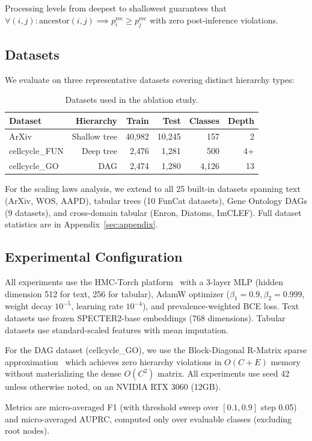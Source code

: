 Processing levels from deepest to shallowest guarantees that $\forall
(i,j): \text{ancestor}(i,j) \implies p_i^{\text{rec}} \geq
p_j^{\text{rec}}$ with zero post-inference violations.

\subsection{Datasets}

We evaluate on three representative datasets covering distinct hierarchy
types:

\begin{table}[H]
\centering
\caption{Datasets used in the ablation study.}
\label{tab:datasets}
\begin{tabular}{lrrrrr}
\toprule
\textbf{Dataset} & \textbf{Hierarchy} & \textbf{Train} & \textbf{Test} &
\textbf{Classes} & \textbf{Depth} \\
\midrule
ArXiv & Shallow tree & 40,982 & 10,245 & 157 & 2 \\
cellcycle\_FUN & Deep tree & 2,476 & 1,281 & 500 & 4+ \\
cellcycle\_GO & DAG & 2,474 & 1,280 & 4,126 & 13 \\
\bottomrule
\end{tabular}
\end{table}

For the scaling laws analysis, we extend to all 25 built-in datasets
spanning text (ArXiv, WOS, AAPD), tabular trees (10 FunCat datasets),
Gene Ontology DAGs (9 datasets), and cross-domain tabular (Enron,
Diatoms, ImCLEF). Full dataset statistics are in Appendix~\ref{sec:appendix}.

\subsection{Experimental Configuration}

All experiments use the HMC-Torch platform~\cite{sette2026hmctorch} with
a 3-layer MLP (hidden dimension 512 for text, 256 for tabular), AdamW
optimizer ($\beta_1=0.9, \beta_2=0.999$, weight decay $10^{-5}$,
learning rate $10^{-4}$), and prevalence-weighted BCE loss. Text
datasets use frozen SPECTER2-base embeddings (768 dimensions). Tabular
datasets use standard-scaled features with mean imputation.

For the DAG dataset (cellcycle\_GO), we use the Block-Diagonal R-Matrix
sparse approximation~\cite{sette2026hmctorch} which achieves zero
hierarchy violations in $O(C+E)$ memory without materializing the dense
$O(C^2)$ matrix. All experiments use seed 42 unless otherwise noted, on
an NVIDIA RTX 3060 (12GB).

Metrics are micro-averaged F1 (with threshold sweep over $[0.1, 0.9]$
step 0.05) and micro-averaged AUPRC, computed only over evaluable
classes (excluding root nodes).
